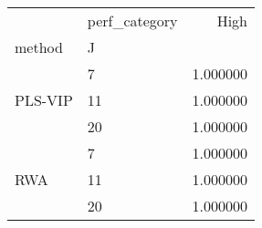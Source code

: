 \begin{tabular}{llr}
\toprule
 & perf_category & High \\
method & J &  \\
\midrule
\multirow[t]{3}{*}{PLS-VIP} & 7 & 1.000000 \\
 & 11 & 1.000000 \\
 & 20 & 1.000000 \\
\cline{1-3}
\multirow[t]{3}{*}{RWA} & 7 & 1.000000 \\
 & 11 & 1.000000 \\
 & 20 & 1.000000 \\
\cline{1-3}
\bottomrule
\end{tabular}
